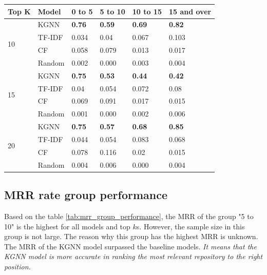 \documentclass[11pt,twoside]{report}
\begin{document}
\begin{center}
    \begin{tabular}{l | l | l | l | l | l}
    \hline
    Top K & Model & 0 to 5 & 5 to 10 & 10 to 15 & 15 and over \\
    \hline
    \multirow{4}{*}{10} 
    & KGNN & \textbf{0.76} & \textbf{0.59} & \textbf{0.69} & \textbf{0.82} \\
    & TF-IDF & 0.034 & 0.04 & 0.067 & 0.103 \\
    & CF & 0.058 & 0.079 & 0.013 & 0.017 \\
    & Random & 0.002 & 0.000 & 0.003 & 0.004 \\
    \hline
    \multirow{4}{*}{15}
    & KGNN & \textbf{0.75} & \textbf{0.53} & \textbf{0.44} & \textbf{0.42} \\
    & TF-IDF & 0.04 & 0.054 & 0.072 & 0.08 \\
    & CF & 0.069 & 0.091 & 0.017 & 0.015 \\
    & Random & 0.001 & 0.000 & 0.002 & 0.006 \\
    \hline
    \multirow{4}{*}{20}
    & KGNN & \textbf{0.75} & \textbf{0.57} & \textbf{0.68} & \textbf{0.85} \\
    & TF-IDF & 0.044 & 0.054 & 0.083 & 0.068 \\
    & CF & 0.078 & 0.116 & 0.02 & 0.015 \\
    & Random & 0.004 & 0.006 & 0.000 & 0.004 \\
    \end{tabular}
    \label{tab:hit_rate_group_performance}
\end{center}

\subsection{MRR rate group performance}
Based on the table \ref{tab:mrr_group_performance}, the MRR of the group "5 to 10" is the highest for all models and top $k$s. However, the sample size in this group is not large. The reason why this group has the highest MRR is unknown. The MRR of the KGNN model surpassed the baseline models. \textit{It means that the KGNN model is more accurate in ranking the most relevant repository to the right position.}
\end{document}
